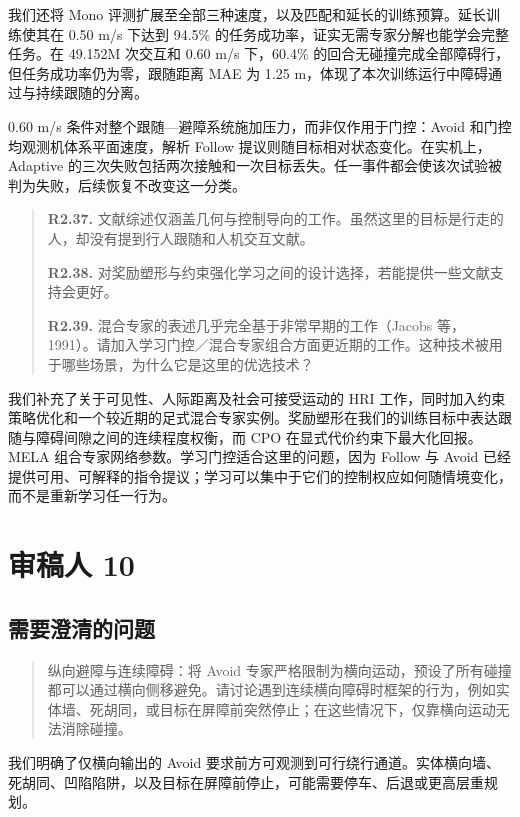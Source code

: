 我们还将 Mono 评测扩展至全部三种速度，以及匹配和延长的训练预算。延长训练使其在 0.50 m/s 下达到 94.5\% 的任务成功率，证实无需专家分解也能学会完整任务。在 49.152M 次交互和 0.60 m/s 下，60.4\% 的回合无碰撞完成全部障碍行，但任务成功率仍为零，跟随距离 MAE 为 1.25 m，体现了本次训练运行中障碍通过与持续跟随的分离。

0.60 m/s 条件对整个跟随—避障系统施加压力，而非仅作用于门控：Avoid 和门控均观测机体系平面速度，解析 Follow 提议则随目标相对状态变化。在实机上，Adaptive 的三次失败包括两次接触和一次目标丢失。任一事件都会使该次试验被判为失败，后续恢复不改变这一分类。

\begin{quote}
\textbf{R2.37.} 文献综述仅涵盖几何与控制导向的工作。虽然这里的目标是行走的人，却没有提到行人跟随和人机交互文献。

\textbf{R2.38.} 对奖励塑形与约束强化学习之间的设计选择，若能提供一些文献支持会更好。

\textbf{R2.39.} 混合专家的表述几乎完全基于非常早期的工作（Jacobs 等，1991）。请加入学习门控／混合专家组合方面更近期的工作。这种技术被用于哪些场景，为什么它是这里的优选技术？
\end{quote}
\response
我们补充了关于可见性、人际距离及社会可接受运动的 HRI 工作，同时加入约束策略优化和一个较近期的足式混合专家实例。奖励塑形在我们的训练目标中表达跟随与障碍间隙之间的连续程度权衡，而 CPO 在显式代价约束下最大化回报。MELA 组合专家网络参数。学习门控适合这里的问题，因为 Follow 与 Avoid 已经提供可用、可解释的指令提议；学习可以集中于它们的控制权应如何随情境变化，而不是重新学习任一行为。

\section*{审稿人 10}
\subsection*{需要澄清的问题}
\begin{quote}
纵向避障与连续障碍：将 Avoid 专家严格限制为横向运动，预设了所有碰撞都可以通过横向侧移避免。请讨论遇到连续横向障碍时框架的行为，例如实体墙、死胡同，或目标在屏障前突然停止；在这些情况下，仅靠横向运动无法消除碰撞。
\end{quote}
\response
我们明确了仅横向输出的 Avoid 要求前方可观测到可行绕行通道。实体横向墙、死胡同、凹陷陷阱，以及目标在屏障前停止，可能需要停车、后退或更高层重规划。

